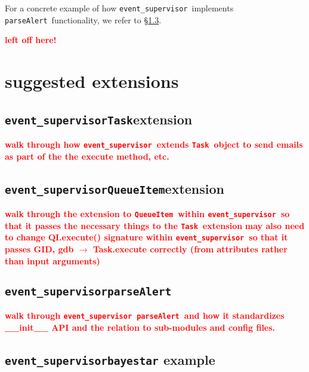 \documentclass{article}
\newcommand{\FIXME}[1]{\textcolor{red}{\textbf{#1}}}
\newcommand{\parseAlert}{\texttt{parseAlert}}
\newcommand{\QueueItem}{\texttt{QueueItem}}
\newcommand{\Task}{\texttt{Task}}
\newcommand{\eventSupervisor}{\texttt{event\_supervisor}}
\begin{document}
For a concrete example of how \eventSupervisor~implements \parseAlert~functionality, we refer to \S\ref{sec: eventSupervisor parseAlert}.


\newpage

\FIXME{left off here!}

\newpage

\section{suggested extensions}
\label{sec: suggested extensions}


\subsection{\eventSupervisor \Task extension}
\label{sec: eventSupervisor Task}

\FIXME{walk through how \eventSupervisor~extends \Task~object to send emails as part of the the execute method, etc.}


\subsection{\eventSupervisor \QueueItem extension}
\label{sec: eventSupervisor QueueItem}

\FIXME{walk through the extension to \QueueItem~within \eventSupervisor~so that it passes the necessary things to the \Task~extension}
\FIXME{may also need to change QI.execute() signature within \eventSupervisor~so that it passes GID, gdb $\rightarrow$ Task.execute correctly (from attributes rather than input arguments)}


\subsection{\eventSupervisor \parseAlert}
\label{sec: eventSupervisor parseAlert}

\FIXME{walk through \eventSupervisor~\parseAlert~and how it standardizes \_\_init\_\_ API and the relation to sub-modules and config files.}


\subsection{\eventSupervisor \texttt{bayestar} example}
\label{sec: eventSupervisor bayestar}
\end{document}
